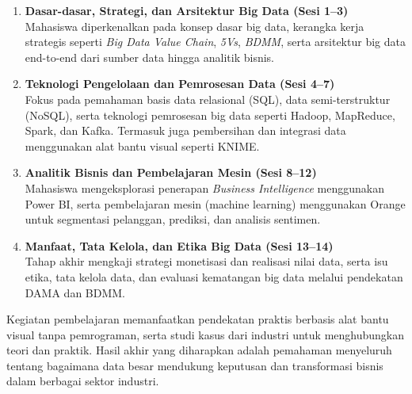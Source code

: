\begin{enumerate}
	\item \textbf{Dasar-dasar, Strategi, dan Arsitektur Big Data (Sesi 1--3)} \\
	Mahasiswa diperkenalkan pada konsep dasar big data, kerangka kerja strategis seperti \textit{Big Data Value Chain}, \textit{5Vs}, \textit{BDMM}, serta arsitektur big data end-to-end dari sumber data hingga analitik bisnis.
	
	\item \textbf{Teknologi Pengelolaan dan Pemrosesan Data (Sesi 4--7)} \\
	Fokus pada pemahaman basis data relasional (SQL), data semi-terstruktur (NoSQL), serta teknologi pemrosesan big data seperti Hadoop, MapReduce, Spark, dan Kafka. Termasuk juga pembersihan dan integrasi data menggunakan alat bantu visual seperti KNIME.
	
	\item \textbf{Analitik Bisnis dan Pembelajaran Mesin (Sesi 8--12)} \\
	Mahasiswa mengeksplorasi penerapan \textit{Business Intelligence} menggunakan Power BI, serta pembelajaran mesin (machine learning) menggunakan Orange untuk segmentasi pelanggan, prediksi, dan analisis sentimen.
	
	\item \textbf{Manfaat, Tata Kelola, dan Etika Big Data (Sesi 13--14)} \\
	Tahap akhir mengkaji strategi monetisasi dan realisasi nilai data, serta isu etika, tata kelola data, dan evaluasi kematangan big data melalui pendekatan DAMA dan BDMM.
\end{enumerate}

Kegiatan pembelajaran memanfaatkan pendekatan praktis berbasis alat bantu visual tanpa pemrograman, serta studi kasus dari industri untuk menghubungkan teori dan praktik. Hasil akhir yang diharapkan adalah pemahaman menyeluruh tentang bagaimana data besar mendukung keputusan dan transformasi bisnis dalam berbagai sektor industri.
